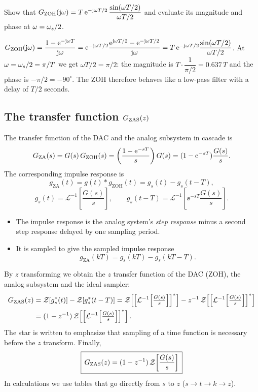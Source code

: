 \begin{problem}
Show that $G_{\mathrm{ZOH}}(\mathrm{j}\omega)=T\,\mathrm{e}^{-\mathrm{j}\omega T/2}\,\dfrac{\sin(\omega T/2)}{\omega T/2}$ and evaluate its
magnitude and phase at $\omega=\omega_s/2$.
\end{problem}
\begin{solution}
$G_{\mathrm{ZOH}}(\mathrm{j}\omega)=\dfrac{1-\mathrm{e}^{-\mathrm{j}\omega T}}{\mathrm{j}\omega}
=\mathrm{e}^{-\mathrm{j}\omega T/2}\dfrac{\mathrm{e}^{\mathrm{j}\omega T/2}-\mathrm{e}^{-\mathrm{j}\omega T/2}}{\mathrm{j}\omega}
=T\,\mathrm{e}^{-\mathrm{j}\omega T/2}\dfrac{\sin(\omega T/2)}{\omega T/2}$. At $\omega=\omega_s/2=\pi/T$ we get
$\omega T/2=\pi/2$: the magnitude is $T\cdot\dfrac{1}{\pi/2}=0.637\,T$ and the phase is $-\pi/2=-90^{\circ}$. The ZOH therefore
behaves like a low-pass filter with a delay of $T/2$ seconds.
\end{solution}

\subsection{The transfer function $G_{\mathrm{ZAS}}(z)$}
The transfer function of the DAC and the analog subsystem in cascade is
\begin{equation}
  G_{\mathrm{ZA}}(s)=G(s)\,G_{\mathrm{ZOH}}(s)=\left(\frac{1-\mathrm{e}^{-sT}}{s}\right)G(s)=(1-\mathrm{e}^{-sT})\frac{G(s)}{s}.
\end{equation}
The corresponding impulse response is
\begin{equation}
  g_{\mathrm{ZA}}(t)=g(t)*g_{\mathrm{ZOH}}(t)=g_s(t)-g_s(t-T),
\end{equation}
\[
  g_s(t)=\mathcal{L}^{-1}\!\left[\frac{G(s)}{s}\right],\qquad
  g_s(t-T)=\mathcal{L}^{-1}\!\left[\ee^{-sT}\frac{G(s)}{s}\right].
\]
\begin{itemize}
  \item The impulse response is the analog system's \emph{step response} minus a second step response
        delayed by one sampling period.
  \item It is sampled to give the sampled impulse response
        \[
          g_{\mathrm{ZA}}(kT)=g_s(kT)-g_s(kT-T).
        \]
\end{itemize}
By $z$ transforming we obtain the $z$ transfer function of the DAC (ZOH), the analog subsystem and the
ideal sampler:
\begin{align}
  \GZAS(z)&=\ZT{g_s^{*}(t)}-\ZT{g_s^{*}(t-T)}
  =\ZT{\left[\mathcal{L}^{-1}\!\left[\tfrac{G(s)}{s}\right]\right]^{*}}
   -z^{-1}\,\ZT{\left[\mathcal{L}^{-1}\!\left[\tfrac{G(s)}{s}\right]\right]^{*}}\notag\\
  &=(1-z^{-1})\,\ZT{\left[\mathcal{L}^{-1}\!\left[\tfrac{G(s)}{s}\right]\right]^{*}}.
\end{align}
The star is written to emphasize that sampling of a time function is necessary before the $z$ transform.
Finally,
\begin{equation}\label{eq:gzas}
  \boxed{\,G_{\mathrm{ZAS}}(z)=(1-z^{-1})\,\mathcal{Z}\!\left[\frac{G(s)}{s}\right]\,}
\end{equation}
In calculations we use tables that go directly from $s$ to $z$ ($s\to t\to k\to z$).

